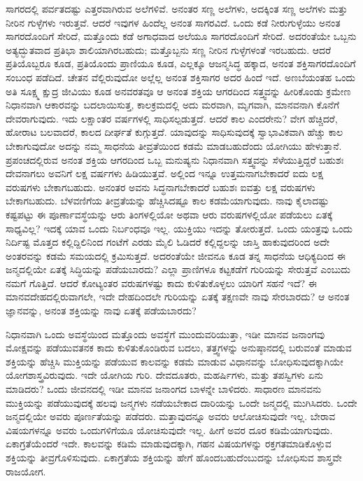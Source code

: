 \vskip 0.2cm

ಸಾಗರದಲ್ಲಿ ಪರ್ವತದಷ್ಟು ಎತ್ತರವಾಗಿರುವ ಅಲೆಗಳಿವೆ. ಅನಂತರ ಸಣ್ಣ ಅಲೆಗಳು, ಅದಕ್ಕಿಂತ ಸಣ್ಣ ಅಲೆಗಳು ಮತ್ತು ನೀರಿನ ಗುಳ್ಳೆಗಳು ಇರುತ್ತವೆ. ಆದರೆ ಇವುಗಳ ಹಿಂದೆಲ್ಲ ಅನಂತ ಸಾಗರವಿದೆ. ಒಂದು ಕಡೆ ನೀರುಗುಳ್ಳೆಯು ಅನಂತ ಸಾಗರದೊಂದಿಗೆ ಸೇರಿದೆ, ಮತ್ತೊಂದು ಕಡೆ ಅಗಾಧವಾದ ಅಲೆಯೂ ಸಾಗರದೊಂದಿಗೆ ಸೇರಿದೆ. ಅದರಂತೆಯೇ ಒಬ್ಬನು ಅತ್ಯದ್ಭುತವಾದ ಪ್ರತಿಭಾ ಶಾಲಿಯಾಗಿರಬಹುದು; ಮತ್ತೊಬ್ಬನು ಸಣ್ಣ ನೀರಿನ ಗುಳ್ಳೆಗಳಂತೆ ಇರಬಹುದು. ಆದರೆ ಪ್ರತಿಯೊಬ್ಬರೂ ಕೂಡ, ಪ್ರತಿಯೊಂದು ಪ್ರಾಣಿಯೂ ಕೂಡ, ಎಲ್ಲಕ್ಕೂ ಆಜನ್ಮಸಿದ್ಧ ಹಕ್ಕಾದ, ಅನಂತ ಶಕ್ತಿಸಾಗರದೊಂದಿಗೆ ಸಂಬಂಧ ಪಡೆದಿದೆ. ಚೇತನ ವೆಲ್ಲಿರುವುದೋ ಅಲ್ಲೆಲ್ಲ ಅನಂತ ಶಕ್ತಿಸಾಗರ ಅದರ ಹಿಂದೆ ಇದೆ. ಅಣಬೆಯಂತಹ ಒಂದು ಅತಿ ಸೂಕ್ಷ್ಮ ಕ್ಷುದ್ರ ಜೀವಿಯು ಕೂಡ ಅನವರತವೂ ಆ ಅನಂತ ಶಕ್ತಿಯ ಆಗರದಿಂದ ಸತ್ತ್ವವನ್ನು ಹೀರಿಕೊಂಡು ಕ್ರಮೇಣ ನಿಧಾನವಾಗಿ ಆಕಾರವನ್ನು ಬದಲಾಯಿಸುತ್ತ, ಕಾಲಕ್ರಮದಲ್ಲಿ ಅದು ಮರವಾಗಿ, ಮೃಗವಾಗಿ, ಮಾನವನಾಗಿ ಕೊನೆಗೆ ದೇವರಾಗುವುದು. ಇದು ಲಕ್ಷಾಂತರ ವರ್ಷಗಳಲ್ಲಿ ಸಾಧಿಸಲ್ಪಡುತ್ತದೆ. ಆದರೆ ಕಾಲ ಎಂದರೇನು? ವೇಗ ಹೆಚ್ಚಿದರೆ, ಹೋರಾಟ ಬಲವಾದರೆ, ಕಾಲದ ದೀರ್ಘತೆ ಕುಗ್ಗುತ್ತದೆ. ಯಾವುದನ್ನು ಸಾಧಿಸುವುದಕ್ಕೆ ಸ್ವಾಭಾವಿಕವಾಗಿ ಹೆಚ್ಚು ಕಾಲ ಬೇಕಾಗುವುದೋ ಅದನ್ನು ನಮ್ಮ ಸಾಧನೆಯ ತೀವ್ರತೆಯಿಂದ ಕಡಮೆ ಮಾಡಬಹುದೆಂದು ಯೋಗಿಯು ಹೇಳುತ್ತಾನೆ. ಪ್ರಪಂಚದಲ್ಲಿರುವ ಅನಂತ ಶಕ್ತಿಯ ಆಗರದಿಂದ ಒಬ್ಬ ಮನುಷ್ಯನು ನಿಧಾನವಾಗಿ ಸತ್ತ್ವವನ್ನು ಸೆಳೆಯುತ್ತಿದ್ದರೆ ಬಹುಶಃ ದೇವನಾಗಲು ಅವನಿಗೆ ಲಕ್ಷ ವರ್ಷಗಳು ಹಿಡಿಯುತ್ತವೆ. ಅಲ್ಲಿಂದ ಇನ್ನೂ ಉತ್ತಮನಾಗಬೇಕಾದರೆ ಐದು ಲಕ್ಷ ವರುಷಗಳು ಬೇಕಾಗಬಹುದು. ಅನಂತರ ಅವನು ಸಿದ್ಧನಾಗಬೇಕಾದರೆ ಬಹುಶಃ ಐವತ್ತು ಲಕ್ಷ ವರುಷಗಳು ಬೇಕಾಗಬಹುದು. ಬೆಳವಣಿಗೆಯ ತೀವ್ರತೆಯನ್ನು ಹೆಚ್ಚಿಸಿದಷ್ಟೂ ಕಾಲ ಕಡಮೆಯಾಗುವುದು. ನಾವು ಕೈಲಾದಷ್ಟು ಕಷ್ಟಪಟ್ಟು ಈ ಪೂರ್ಣಾವಸ್ಥೆಯನ್ನು ಆರು ತಿಂಗಳಲ್ಲಿಯೋ ಅಥವಾ ಆರು ವರುಷಗಳಲ್ಲಿಯೋ ಪಡೆಯಲು ಏತಕ್ಕೆ ಸಾಧ್ಯವಿಲ್ಲ? ಇದಕ್ಕೆ ಯಾವ ಒಂದು ನಿರ್ಬಂಧವೂ ಇಲ್ಲ. ಯುಕ್ತಿಯು ಇದನ್ನು ತೋರುತ್ತದೆ. ಒಂದು ಯಂತ್ರವು ಒಂದು ನಿರ್ದಿಷ್ಟ ಮೊತ್ತದ ಕಲ್ಲಿದ್ದಿಲಿನಿಂದ ಗಂಟೆಗೆ ಎರಡು ಮೈಲಿ ಓಡಿದರೆ ಕಲ್ಲಿದ್ದಲನ್ನು ಜಾಸ್ತಿ ಹಾಕುವುದರಿಂದ ಅದೇ ಅಂತರವನ್ನು ಕಡಮೆ ಸಮಯದಲ್ಲಿ ಕ್ರಮಿಸುತ್ತದೆ. ಅದರಂತೆಯೇ ಜೀವನೂ ಕೂಡ ತನ್ನ ಸಾಧನೆಯ ಆಧಿಕ್ಯದಿಂದ ಈ ಜನ್ಮದಲ್ಲಿಯೇ ಏತಕ್ಕೆ ಸಿದ್ಧಿಯನ್ನು ಪಡೆಯಬಾರದು? ಎಲ್ಲಾ ಪ್ರಾಣಿಗಳೂ ಕಟ್ಟಕಡೆಗೆ ಗುರಿಯನ್ನು ಸೇರುತ್ತವೆ ಎಂಬುದು ನಮಗೆ ಗೊತ್ತಿದೆ. ಆದರೆ ಕೋಟ್ಯಂತರ ವರುಷಗಳಷ್ಟು ಕಾದು ಕುಳಿತುಕೊಳ್ಳಲು ಯಾರಿಗೆ ಸಹನೆ ಇದೆ? ಈ ಮಾನವದೇಹದಲ್ಲಿರುವಾಗಲೇ, ಇದೇ ದೇಹದಿಂದಲೇ ಗುರಿಯನ್ನು ಏತಕ್ಕೆ ತಕ್ಷಣವೇ ನಾವು ಸೇರಬಾರದು? ಆ ಅನಂತ ಜ್ಞಾನವನ್ನು, ಅನಂತ ಶಕ್ತಿಯನ್ನು ನಾವು ಏತಕ್ಕೆ ಪಡೆಯಬಾರದು?

\vskip 0.2cm

ನಿಧಾನವಾಗಿ ಒಂದು ಅವಸ್ಥೆಯಿಂದ ಮತ್ತೊಂದು ಅವಸ್ಥೆಗೆ ಮುಂದುವರಿಯುತ್ತಾ, ಇಡೀ ಮಾನವ ಜನಾಂಗವು ಮೋಕ್ಷವನ್ನು ಪಡೆಯುವತನಕ ಕಾದು ಕುಳಿತುಕೊಂಡಿರುವ ಬದಲು, ತತ್ತ್ವಗಳನ್ನು ಅನುಷ್ಠಾನದಲ್ಲಿ ಬರುವಂತೆ ಮಾಡುವ ಶಕ್ತಿಯನ್ನು ಹೆಚ್ಚಿಸಿ ಮುಕ್ತಿಯನ್ನು ಪಡೆಯುವ ಕಾಲವನ್ನು ಕಡಮೆ ಮಾಡುವ ವಿಧಾನವನ್ನು ಬೋಧಿಸುವುದಕ್ಕಾಗಿಯೇ ಯೋಗಶಾಸ್ತ್ರವಿರುವುದು. ಇದೇ ಯೋಗಿಯ ಗುರಿ. ದೇವದೂತರು, ಮಹರ್ಷಿಗಳು, ಮತ್ತು ತಪಸ್ವಿಗಳು ಏನು ಮಾಡಿದರು? ಒಂದು ಜೀವನದಲ್ಲಿ ಇಡೀ ಮಾನವ ಜನಾಂಗದ ಬಾಳನ್ನೇ ಬಾಳಿದರು. ಸಾಧಾರಣ ಮಾನವನು ಮುಕ್ತಿಯನ್ನು ಪಡೆಯುವುದಕ್ಕೆ ಹಲವು ಜನ್ಮಗಳು ನಡೆಯಬೇಕಾದ ದಾರಿಯನ್ನು ಒಂದೇ ಜನ್ಮದಲ್ಲಿ ಮುಗಿಸಿದರು. ಒಂದೇ ಜನ್ಮದಲ್ಲಿಯೇ ಅವರು ಪೂರ್ಣತೆಯನ್ನು ಪಡೆದರು. ಮತ್ತಾವುದನ್ನೂ ಅವರು ಆಲೋಚಿಸುವುದೇ ಇಲ್ಲ. ಬೇರಾವ ವಿಷಯಗಳನ್ನೂ ಅವರು ಒಂದು\break ಗಳಿಗೆಯೂ ಯೋಚಿಸುವುದೇ ಇಲ್ಲ. ಹೀಗೆ ಅವರ ದೂರ ಕಡಿಮೆಯಾಗುವುದು. ಏಕಾಗ್ರತೆಯೆಂದರೆ ಇದೇ. ಕಾಲವನ್ನು ಕಡಿಮೆ ಮಾಡುವುದಕ್ಕಾಗಿ, ಗಹನ ವಿಷಯಗಳನ್ನು ರಕ್ತಗತಮಾಡಿಕೊಳ್ಳುವ ಶಕ್ತಿಯನ್ನು ತೀವ್ರಗೊಳಿಸುವುದು. ಏಕಾಗ್ರತೆಯ ಶಕ್ತಿಯನ್ನು ಹೇಗೆ ಹೊಂದಬಹುದೆಂಬುದನ್ನು ಬೋಧಿಸುವ ಶಾಸ್ತ್ರವೇ ರಾಜಯೋಗ. 

